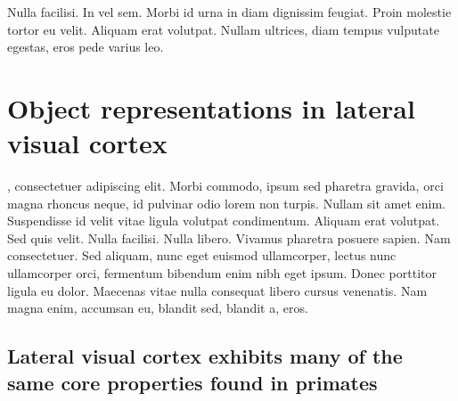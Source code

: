 \begin{savequote}[75mm]
Nulla facilisi. In vel sem. Morbi id urna in diam dignissim feugiat. Proin molestie tortor eu velit. Aliquam erat volutpat. Nullam ultrices, diam tempus vulputate egestas, eros pede varius leo.
\end{savequote}

\chapter{Object representations in lateral visual cortex}

, consectetuer adipiscing elit. Morbi commodo, ipsum sed pharetra gravida, orci magna rhoncus neque, id pulvinar odio lorem non turpis. Nullam sit amet enim. Suspendisse id velit vitae ligula volutpat condimentum. Aliquam erat volutpat. Sed quis velit. Nulla facilisi. Nulla libero. Vivamus pharetra posuere sapien. Nam consectetuer. Sed aliquam, nunc eget euismod ullamcorper, lectus nunc ullamcorper orci, fermentum bibendum enim nibh eget ipsum. Donec porttitor ligula eu dolor. Maecenas vitae nulla consequat libero cursus venenatis. Nam magna enim, accumsan eu, blandit sed, blandit a, eros.


\section{Lateral visual cortex exhibits many of the same core properties found in primates}

